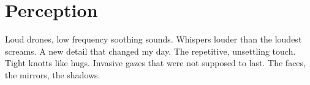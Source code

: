 
\chapter*{Perception}

Loud drones, low frequency soothing sounds.
Whispers louder than the loudest screams. 
A new detail that changed my day. 
The repetitive, unsettling  touch.
Tight knotts like hugs. 
Invasive gazes that were not supposed to last.
The faces, the mirrors, the shadows. 
